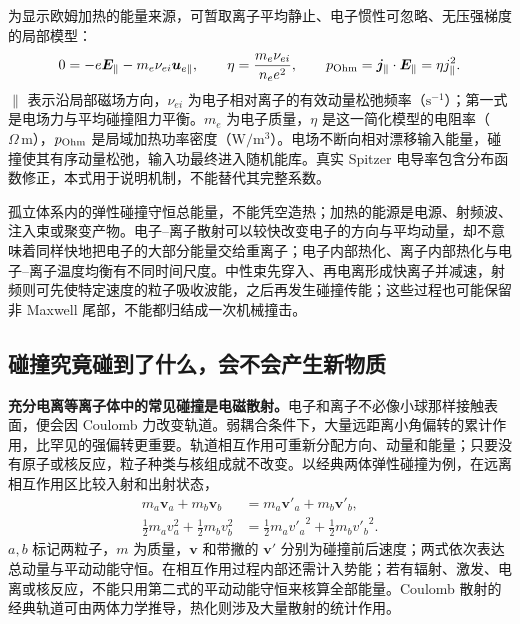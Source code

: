 \documentclass[12pt,fontset=none]{ctexart}
\numberwithin{equation}{section}
\numberwithin{table}{section}
\numberwithin{figure}{section}
\begin{document}
为显示欧姆加热的能量来源，可暂取离子平均静止、电子惯性可忽略、无压强梯度的局部模型：
\begin{equation}\label{eq:micro-ohmheat}
 0=-e\bm E_\parallel-m_e\nu_{ei}\bm u_{e\parallel},\qquad
 \eta=\frac{m_e\nu_{ei}}{n_e e^2},\qquad
 p_{\rm Ohm}=\bm j_\parallel\cdot\bm E_\parallel
 =\eta j_\parallel^2.
\end{equation}
$\parallel$ 表示沿局部磁场方向，$\nu_{ei}$ 为电子相对离子的有效动量松弛频率（$\mathrm{s^{-1}}$）；第一式是电场力与平均碰撞阻力平衡。$m_e$ 为电子质量，$\eta$ 是这一简化模型的电阻率（$\Omega\,\mathrm m$），$p_{\rm Ohm}$ 是局域加热功率密度（$\mathrm{W/m^3}$）。电场不断向相对漂移输入能量，碰撞使其有序动量松弛，输入功最终进入随机能库。真实 Spitzer 电导率包含分布函数修正，本式用于说明机制，不能替代其完整系数。

孤立体系内的弹性碰撞守恒总能量，不能凭空造热；加热的能源是电源、射频波、注入束或聚变产物。电子--离子散射可以较快改变电子的方向与平均动量，却不意味着同样快地把电子的大部分能量交给重离子；电子内部热化、离子内部热化与电子--离子温度均衡有不同时间尺度。中性束先穿入、再电离形成快离子并减速，射频则可先使特定速度的粒子吸收波能，之后再发生碰撞传能；这些过程也可能保留非 Maxwell 尾部，不能都归结成一次机械撞击\cite{Pheat}。

\subsection{碰撞究竟碰到了什么，会不会产生新物质}\label{sec:micro-collisions}

\textbf{充分电离等离子体中的常见碰撞是电磁散射。}电子和离子不必像小球那样接触表面，便会因 Coulomb 力改变轨道。弱耦合条件下，大量远距离小角偏转的累计作用，比罕见的强偏转更重要。轨道相互作用可重新分配方向、动量和能量；只要没有原子或核反应，粒子种类与核组成就不改变。以经典两体弹性碰撞为例，在远离相互作用区比较入射和出射状态，
\begin{align}
 m_a\bm v_a+m_b\bm v_b&=m_a\bm v'_a+m_b\bm v'_b,\label{eq:micro-momentum}\\
 \frac12m_av_a^2+\frac12m_bv_b^2&=
 \frac12m_a{v'_a}^2+\frac12m_b{v'_b}^2.\label{eq:micro-elastic}
\end{align}
$a,b$ 标记两粒子，$m$ 为质量，$\bm v$ 和带撇的 $\bm v'$ 分别为碰撞前后速度；两式依次表达总动量与平动动能守恒。在相互作用过程内部还需计入势能；若有辐射、激发、电离或核反应，不能只用第二式的平动动能守恒来核算全部能量。Coulomb 散射的经典轨道可由两体力学推导，热化则涉及大量散射的统计作用\cite{Pcoulomb}。
\end{document}
